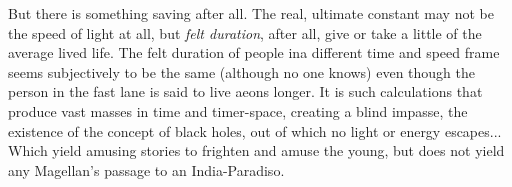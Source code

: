 But there is something saving after all. The
real, ultimate constant may not be the speed
of light at all, but \emph{felt duration}, after all, give
or take a little of the average lived life. The
felt duration of people ina different time and
speed frame seems subjectively to be the
same (although no one knows) even though
the person in the fast lane is said to live
aeons longer. It is such calculations that
produce vast masses in time and timer-space,
creating a blind impasse, the existence of the
concept of black holes, out of which no light
or energy escapes... Which yield amusing
stories to frighten and amuse the young, but
does not yield any Magellan's passage to an
India-Paradiso.
